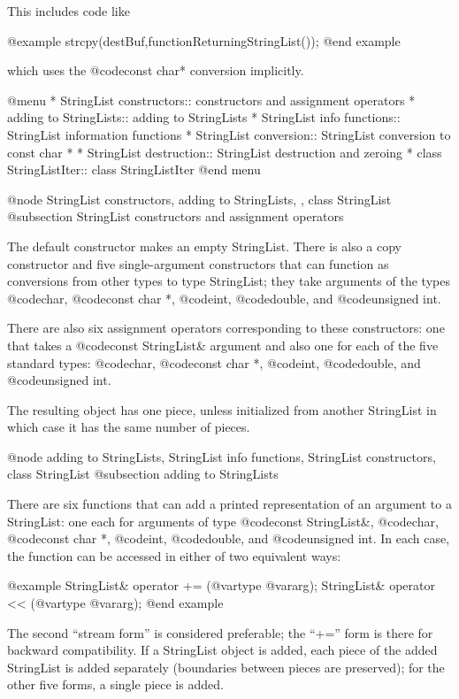 This includes code like

@example
strcpy(destBuf,functionReturningStringList());
@end example

which uses the @code{const char*} conversion implicitly.

@menu
* StringList constructors::  constructors and assignment operators
* adding to StringLists::  adding to StringLists
* StringList info functions::  StringList information functions
* StringList conversion::  StringList conversion to const char *
* StringList destruction::  StringList destruction and zeroing
* class StringListIter::  class StringListIter
@end menu

@node StringList constructors, adding to StringLists,  , class StringList
@subsection StringList constructors and assignment operators

The default constructor makes an empty StringList.  There is also
a copy constructor and five single-argument constructors that can
function as conversions from other types to type StringList; they
take arguments of the types
@code{char}, @code{const char *}, @code{int}, @code{double}, and
@code{unsigned int}.

There are also six assignment operators corresponding to these
constructors: one that takes a @code{const StringList&} argument and
also one for each of the five standard types:
@code{char}, @code{const char *}, @code{int}, @code{double}, and
@code{unsigned int}.

The resulting object has one piece, unless initialized from another
StringList in which case it has the same number of pieces.

@node adding to StringLists, StringList info functions, StringList constructors, class StringList
@subsection adding to StringLists

There are six functions that can add a printed representation of an
argument to a StringList: one each for arguments of type
@code{const StringList&}, @code{char}, @code{const char *}, @code{int},
@code{double}, and @code{unsigned int}.  In each case, the function
can be accessed in either of two equivalent ways:

@example
StringList& operator += (@var{type} @var{arg});
StringList& operator << (@var{type} @var{arg});
@end example

The second ``stream form'' is considered preferable; the ``+='' form is
there for backward compatibility.  If a StringList object is added,
each piece of the added StringList is added separately (boundaries
between pieces are preserved); for the other five forms, a single
piece is added.

